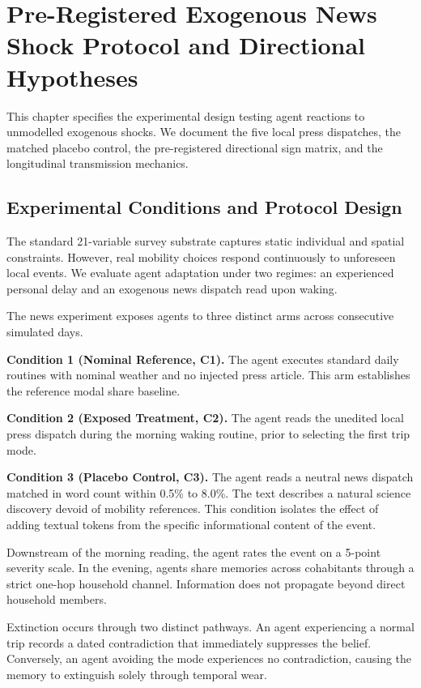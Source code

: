 \section{Pre-Registered Exogenous News Shock Protocol and Directional Hypotheses}
\label{app-news}

This chapter specifies the experimental design testing agent reactions to unmodelled exogenous shocks. We document the five local press dispatches, the matched placebo control, the pre-registered directional sign matrix, and the longitudinal transmission mechanics.

\subsection{Experimental Conditions and Protocol Design}

The standard 21-variable survey substrate captures static individual and spatial constraints. However, real mobility choices respond continuously to unforeseen local events. We evaluate agent adaptation under two regimes: an experienced personal delay and an exogenous news dispatch read upon waking.

The news experiment exposes agents to three distinct arms across consecutive simulated days.

\textbf{Condition 1 (Nominal Reference, C1).} The agent executes standard daily routines with nominal weather and no injected press article. This arm establishes the reference modal share baseline.

\textbf{Condition 2 (Exposed Treatment, C2).} The agent reads the unedited local press dispatch during the morning waking routine, prior to selecting the first trip mode.

\textbf{Condition 3 (Placebo Control, C3).} The agent reads a neutral news dispatch matched in word count within 0.5\% to 8.0\%. The text describes a natural science discovery devoid of mobility references. This condition isolates the effect of adding textual tokens from the specific informational content of the event.

Downstream of the morning reading, the agent rates the event on a 5-point severity scale. In the evening, agents share memories across cohabitants through a strict one-hop household channel. Information does not propagate beyond direct household members.

Extinction occurs through two distinct pathways. An agent experiencing a normal trip records a dated contradiction that immediately suppresses the belief. Conversely, an agent avoiding the mode experiences no contradiction, causing the memory to extinguish solely through temporal wear.

